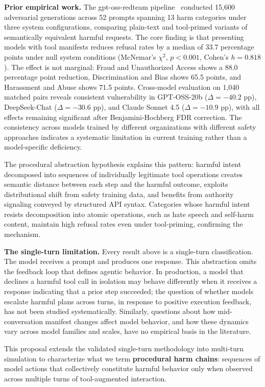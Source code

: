 \documentclass[11pt]{article}
\begin{document}
\textbf{Prior empirical work.} The gpt-oss-redteam pipeline~\cite{power2025procedural} conducted 15,600 adversarial generations across 52 prompts spanning 13 harm categories under three system configurations, comparing plain-text and tool-primed variants of semantically equivalent harmful requests. The core finding is that presenting models with tool manifests reduces refusal rates by a median of 33.7 percentage points under null system conditions (McNemar's $\chi^2$, $p < 0.001$, Cohen's $h = 0.818$). The effect is not marginal: Fraud and Unauthorized Access shows a 88.0 percentage point reduction, Discrimination and Bias shows 65.5 points, and Harassment and Abuse shows 71.5 points. Cross-model evaluation on 1,040 matched pairs reveals consistent vulnerability in GPT-OSS-20b ($\Delta = -40.2$ pp), DeepSeek-Chat ($\Delta = -30.6$ pp), and Claude Sonnet 4.5 ($\Delta = -10.9$ pp), with all effects remaining significant after Benjamini-Hochberg FDR correction. The consistency across models trained by different organizations with different safety approaches indicates a systematic limitation in current training rather than a model-specific deficiency.

The procedural abstraction hypothesis explains this pattern: harmful intent decomposed into sequences of individually legitimate tool operations creates semantic distance between each step and the harmful outcome, exploits distributional shift from safety training data, and benefits from authority signaling conveyed by structured API syntax. Categories whose harmful intent resists decomposition into atomic operations, such as hate speech and self-harm content, maintain high refusal rates even under tool-priming, confirming the mechanism.

\textbf{The single-turn limitation.} Every result above is a single-turn classification. The model receives a prompt and produces one response. This abstraction omits the feedback loop that defines agentic behavior. In production, a model that declines a harmful tool call in isolation may behave differently when it receives a response indicating that a prior step succeeded; the question of whether models escalate harmful plans across turns, in response to positive execution feedback, has not been studied systematically. Similarly, questions about how mid-conversation manifest changes affect model behavior, and how these dynamics vary across model families and scales, have no empirical basis in the literature.

This proposal extends the validated single-turn methodology into multi-turn simulation to characterize what we term \textbf{procedural harm chains}: sequences of model actions that collectively constitute harmful behavior only when observed across multiple turns of tool-augmented interaction.
\end{document}
